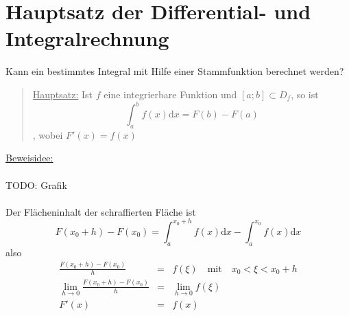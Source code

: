 \documentclass{report}
\begin{document}
\section{Hauptsatz der Differential- und Integralrechnung}
Kann ein bestimmtes Integral mit Hilfe einer Stammfunktion berechnet werden?
\begin{quote}\underline{Hauptsatz:} Ist $f$ eine integrierbare Funktion und $[a;b] \subset D_f$, so ist
\begin{equation}\int_a^b f(x) \mathrm{d}x = F(b)-F(a)\end{equation}
, wobei $F'(x) = f(x)$\end{quote}
\underline{Beweisidee:}
\\\\TODO: Grafik\\\\
Der Flächeninhalt der schraffierten Fläche ist
\begin{equation}F(x_0 + h) - F(x_0) = \int_a^{x_0+h} f(x) \mathrm{d}x - \int_a^{x_0} f(x) \mathrm{d}x\end{equation}
also
\begin{eqnarray}\frac{F(x_0 + h) - F(x_0)}{h} & = & f(\xi) \quad \mbox{mit} \quad x_0 < \xi < x_0 + h \nonumber \\
\lim_{h \to 0} \frac{F(x_0 + h) - F(x_0)}{h} & = & \lim_{h \to 0} f(\xi) \nonumber \\
F'(x) & = & f(x)\end{eqnarray}
\end{document}
